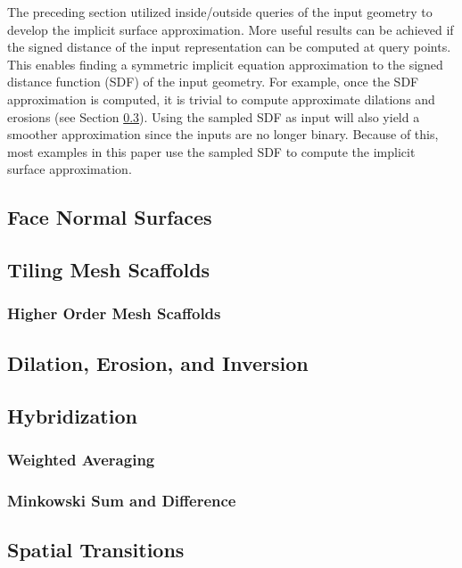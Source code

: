 \documentclass[acmtog]{acmart}
\begin{document}
The preceding section utilized inside/outside queries of the input geometry to develop the implicit surface approximation. More useful results can be achieved if the signed distance of the input representation can be computed at query points. This enables finding a symmetric implicit equation approximation to the signed distance function (SDF) of the input geometry. For example, once the SDF approximation is computed, it is trivial to compute approximate dilations and erosions (see Section \ref{sec:dilation_erosion_inversion}). Using the sampled SDF as input will also yield a smoother approximation since the inputs are no longer binary. Because of this, most examples in this paper use the sampled SDF to compute the implicit surface approximation.

\subsection{Face Normal Surfaces}
\label{sec:face_normal_surfaces}

\subsection{Tiling Mesh Scaffolds}
\label{sec:tiling_mesh_scaffolds}

\subsubsection{Higher Order Mesh Scaffolds}

\subsection{Dilation, Erosion, and Inversion}
\label{sec:dilation_erosion_inversion}

\subsection{Hybridization}

\subsubsection{Weighted Averaging}

\subsubsection{Minkowski Sum and Difference}

\subsection{Spatial Transitions}
\label{sec:spatial_transitions}
\end{document}
